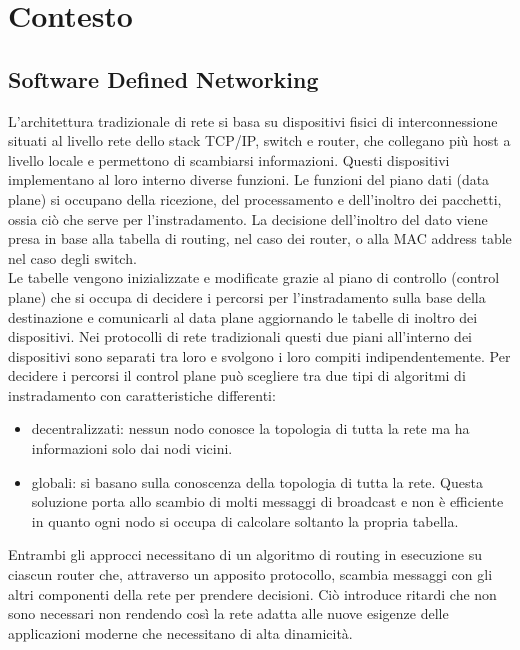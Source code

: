 \chapter{Contesto}
\label{cap:contesto}
\section{Software Defined Networking}
\label{ch:SDN}

L'architettura tradizionale di rete si basa su dispositivi fisici di interconnessione situati al livello rete dello stack TCP/IP, switch e router, che collegano più host a livello locale e permettono di scambiarsi informazioni.
Questi dispositivi implementano al loro interno diverse funzioni. 
Le funzioni del piano dati (data plane) si occupano della ricezione, del processamento e dell'inoltro dei pacchetti, ossia ciò che serve per l'instradamento. La decisione dell'inoltro del dato 
viene presa in base alla tabella di routing, nel caso dei router, o alla MAC address table nel caso degli switch. 
\\Le tabelle vengono inizializzate e modificate grazie al piano di controllo (control plane) che si occupa di decidere i percorsi 
per l'instradamento sulla base della destinazione e comunicarli al data plane aggiornando le tabelle di inoltro dei dispositivi. 
Nei protocolli di rete tradizionali questi due piani all'interno dei dispositivi sono separati tra loro e svolgono i loro compiti indipendentemente.
Per decidere i percorsi il control plane può scegliere tra due tipi di algoritmi di instradamento con caratteristiche differenti: 
\begin{itemize}
\item decentralizzati: nessun nodo conosce la topologia di tutta la rete ma ha informazioni solo dai nodi vicini. 
\item globali: si basano sulla conoscenza della topologia di tutta la rete. Questa soluzione
porta allo scambio di molti messaggi di broadcast e non è efficiente in quanto ogni
nodo si occupa di calcolare soltanto la propria tabella.
\end{itemize}
Entrambi gli approcci necessitano di un algoritmo di routing in esecuzione su ciascun router che, attraverso un apposito protocollo, 
scambia messaggi con gli altri componenti della rete per prendere decisioni. 
Ciò introduce ritardi che non sono necessari non rendendo così la rete adatta alle nuove esigenze delle applicazioni moderne che necessitano di alta dinamicità.
